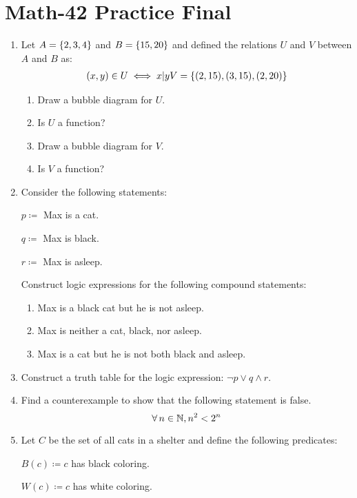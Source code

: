\documentclass[letterpaper,12pt,fleqn]{article}
\begin{document}
\section*{Math-42 Practice Final}

\begin{enumerate}[left=0in]
\item Let \(A=\{2,3,4\}\) and \(B=\{15,20\}\) and defined the relations \(U\) and \(V\) between \(A\) and
  \(B\) as:
  \begin{gather*}
    (x,y)\in U\iff x|y
    V=\{(2,15),(3,15),(2,20)\}
  \end{gather*}
  \begin{enumerate}
  \item Draw a bubble diagram for \(U\).
  \item Is \(U\) a function?
  \item Draw a bubble diagram for \(V\).
  \item Is \(V\) a function?
  \end{enumerate}

\item Consider the following statements:

  \(p\coloneqq\) Max is a cat.

  \(q\coloneqq\) Max is black.

  \(r\coloneqq\) Max is asleep.

  Construct logic expressions for the following compound statements:
  \begin{enumerate}
  \item Max is a black cat but he is not asleep.
  \item Max is neither a cat, black, nor asleep.
  \item Max is a cat but he is not both black and asleep.
  \end{enumerate}

\item Construct a truth table for the logic expression: \(\lnot p\lor q\land r\).

\item Find a counterexample to show that the following statement is false.
  \[\forall\,n\in\mathbb{N},n^2<2^n\]

\item Let \(C\) be the set of all cats in a shelter and define the following predicates:

  \(B(c)\coloneqq c\) has black coloring.

  \(W(c)\coloneqq c\) has white coloring.


\end{enumerate}
\end{document}
